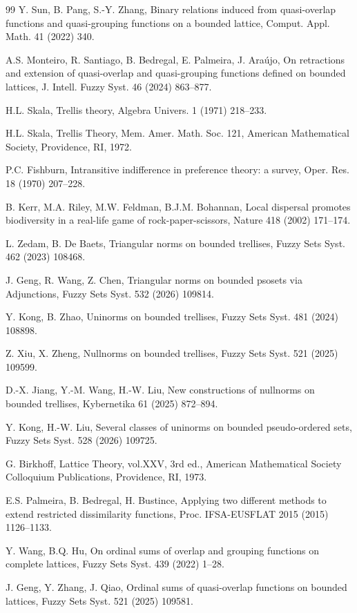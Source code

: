 \documentclass[preprint,12pt]{elsarticle}
\begin{document}
\begin{thebibliography}{99}
Y. Sun, B. Pang, S.-Y. Zhang, Binary relations induced from quasi-overlap functions and quasi-grouping functions on a bounded lattice, Comput. Appl. Math. 41 (2022) 340.

A.S. Monteiro, R. Santiago, B. Bedregal, E. Palmeira, J. Ara\'ujo, On retractions and extension of quasi-overlap and quasi-grouping functions defined on bounded lattices, J. Intell. Fuzzy Syst. 46 (2024) 863--877.

H.L. Skala, Trellis theory, Algebra Univers. 1 (1971) 218--233.

H.L. Skala, Trellis Theory, Mem. Amer. Math. Soc. 121, American Mathematical Society, Providence, RI, 1972.

P.C. Fishburn, Intransitive indifference in preference theory: a survey, Oper. Res. 18 (1970) 207--228.

B. Kerr, M.A. Riley, M.W. Feldman, B.J.M. Bohannan, Local dispersal promotes biodiversity in a real-life game of rock-paper-scissors, Nature 418 (2002) 171--174.

L. Zedam, B. De Baets, Triangular norms on bounded trellises, Fuzzy Sets Syst. 462 (2023) 108468.

J. Geng, R. Wang, Z. Chen, Triangular norms on bounded psosets via Adjunctions, Fuzzy Sets Syst. 532 (2026) 109814.

Y. Kong, B. Zhao, Uninorms on bounded trellises, Fuzzy Sets Syst. 481 (2024) 108898.

Z. Xiu, X. Zheng, Nullnorms on bounded trellises, Fuzzy Sets Syst. 521 (2025) 109599.

D.-X. Jiang, Y.-M. Wang, H.-W. Liu, New constructions of nullnorms on bounded trellises, Kybernetika 61 (2025) 872--894.

Y. Kong, H.-W. Liu, Several classes of uninorms on bounded pseudo-ordered sets, Fuzzy Sets Syst. 528 (2026) 109725.

 G. Birkhoff, Lattice Theory, vol.XXV, 3rd ed., American Mathematical Society Colloquium Publications, Providence, RI, 1973.

E.S. Palmeira, B. Bedregal, H. Bustince,
Applying two different methods to extend restricted dissimilarity functions,
Proc. IFSA-EUSFLAT 2015 (2015) 1126--1133.

Y. Wang, B.Q. Hu,
On ordinal sums of overlap and grouping functions on complete lattices,
Fuzzy Sets Syst. 439 (2022) 1--28.

J. Geng, Y. Zhang, J. Qiao,
Ordinal sums of quasi-overlap functions on bounded lattices,
Fuzzy Sets Syst. 521 (2025) 109581.
\end{thebibliography}
\end{document}
